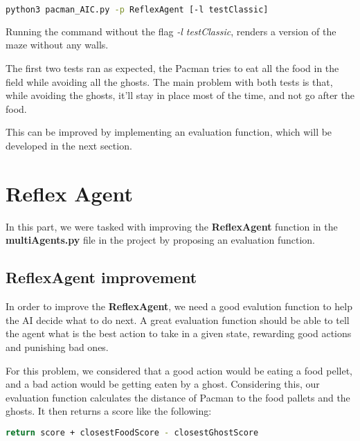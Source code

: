 \documentclass{article}
\begin{document}
\hbox{}

\begin{lstlisting}[language=bash, frame=tlbr, framesep=6pt, backgroundcolor=\color{light-gray}]
  python3 pacman_AIC.py -p ReflexAgent [-l testClassic]
\end{lstlisting}

\hbox{}

Running the command without the flag \textit{-l testClassic}, renders a version of the maze without any walls.

The first two tests ran as expected, the Pacman tries to eat all the food in the field while avoiding all the ghosts. The main problem with both tests is that, while avoiding the ghosts, it'll stay in place most of the time, and not go after the food.

This can be improved by implementing an evaluation function, which will be developed in the next section.

\pagebreak
\section{Reflex Agent}

In this part, we were tasked with improving the \textbf{ReflexAgent} function in the \textbf{multiAgents.py} file in the project by proposing an evaluation function.

\subsection{ReflexAgent improvement}

In order to improve the \textbf{ReflexAgent}, we need a good evalution function to help the AI decide what to do next. A great evaluation function should be able to tell the agent what is the best action to take in a given state, rewarding good actions and punishing bad ones.

For this problem, we considered that a good action would be eating a food pellet, and a bad action would be getting eaten by a ghost. Considering this, our evaluation function calculates the distance of Pacman to the food pallets and the ghosts. It then returns a score like the following:

\hbox{}

\begin{lstlisting}[language=bash, frame=tlbr, framesep=6pt, backgroundcolor=\color{light-gray}]
    return score + closestFoodScore - closestGhostScore
\end{lstlisting}
\end{document}
